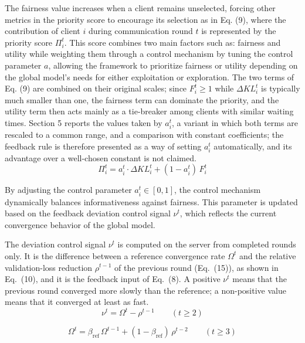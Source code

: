 \documentclass[pdflatex,sn-mathphys-num,oneside]{sn-jnl}%
\theoremstyle{thmstyleone}%
\theoremstyle{thmstyletwo}%
\theoremstyle{thmstylethree}%
\begin{document}
The fairness value increases when a client remains unselected, forcing other metrics in the priority score to encourage its selection as in Eq. (9), where the contribution of client $i$ during communication round $t$ is represented by the priority score $\Pi_i^t$. This score combines two main factors such as: fairness and utility while weighting them through a control mechanism by tuning the control parameter $a$, allowing the framework to prioritize fairness or utility depending on the global model's needs for either exploitation or exploration. The two terms of Eq. (9) are combined on their original scales; since $F_i^t \ge 1$ while $\Delta KL_i^t$ is typically much smaller than one, the fairness term can dominate the priority, and the utility term then acts mainly as a tie-breaker among clients with similar waiting times. Section 5 reports the values taken by $a_i^t$, a variant in which both terms are rescaled to a common range, and a comparison with constant coefficients; the feedback rule is therefore presented as a way of setting $a_i^t$ automatically, and its advantage over a well-chosen constant is not claimed.
\begin{equation}
\Pi_i^t = a_i^t \cdot \Delta KL_i^t + (1 - a_i^t)\, F_i^t
\label{eq:priority}
\end{equation}

By adjusting the control parameter $a_i^t \in [0,1]$, the control mechanism dynamically balances informativeness against fairness. This parameter is updated based on the feedback deviation control signal $\nu^t$, which reflects the current convergence behavior of the global model.

The deviation control signal $\nu^t$ is computed on the server from completed rounds only. It is the difference between a reference convergence rate $\Omega^t$ and the relative validation-loss reduction $\rho^{t-1}$ of the previous round (Eq.~(15)), as shown in Eq.~(10), and it is the feedback input of Eq.~(8). A positive $\nu^t$ means that the previous round converged more slowly than the reference; a non-positive value means that it converged at least as fast.
\begin{equation}
\nu^t = \Omega^t - \rho^{t-1}\qquad (t \ge 2)
\label{eq:deviation}
\end{equation}

\begin{equation}
\Omega^t = \beta_{\text{ref}}\,\Omega^{t-1} + (1-\beta_{\text{ref}})\,\rho^{t-2}\qquad (t \ge 3)
\label{eq:reference_rate}
\end{equation}
\end{document}
